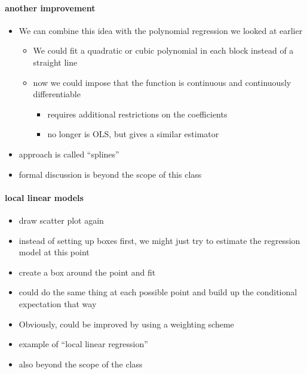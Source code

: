 \paragraph{another improvement}
\begin{itemize}
\item We can combine this idea with the polynomial regression we
         looked at earlier
\begin{itemize}
\item We could fit a quadratic or cubic polynomial in each block
           instead of a straight line
\item now we could impose that the function is continuous and
           continuously differentiable
\begin{itemize}
\item requires additional restrictions on the coefficients
\item no longer is OLS, but gives a similar estimator
\end{itemize}
\end{itemize}
\item approach is called ``splines''
\item formal discussion is beyond the scope of this class
\end{itemize}

\paragraph{local linear models}
\begin{itemize}
\item draw scatter plot again
\item instead of setting up boxes first, we might just try to
        estimate the regression model at this point
\item create a box around the point and fit
\item could do the same thing at each possible point and build up
        the conditional expectation that way
\item Obviously, could be improved by using a weighting scheme
\item example of ``local linear regression''
\item also beyond the scope of the class
\end{itemize}

